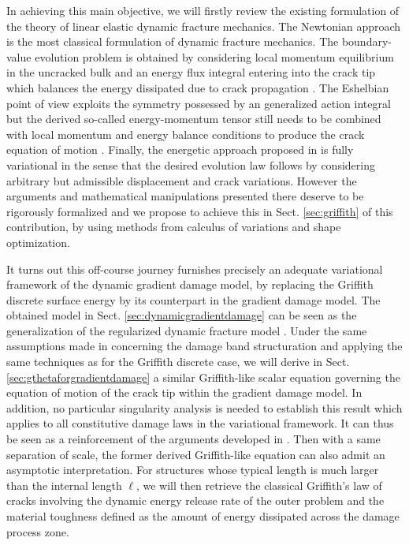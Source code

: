 In achieving this main objective, we will firstly review the existing formulation of the theory of linear elastic dynamic fracture mechanics. The Newtonian approach \cite{Freund:1990} is the most classical formulation of dynamic fracture mechanics. The boundary-value evolution problem is obtained by considering local momentum equilibrium in the uncracked bulk and an energy flux integral entering into the crack tip which balances the energy dissipated due to crack propagation \cite{NakamuraShihFreund:1985,Cherepanov:1989}. The Eshelbian point of view \cite{Eshelby:1951} exploits the symmetry possessed by an generalized action integral but the derived so-called energy-momentum tensor still needs to be combined with local momentum and energy balance conditions to produce the crack equation of motion \cite{Adda-BediaAriasAmarLund:1999}. Finally, the energetic approach proposed in \cite{Oleaga:2001} is fully variational in the sense that the desired evolution law follows by considering arbitrary but admissible displacement and crack variations. However the arguments and mathematical manipulations presented there deserve to be rigorously formalized and we propose to achieve this in Sect. \ref{sec:griffith} of this contribution, by using methods from calculus of variations and shape optimization.

It turns out this off-course journey furnishes precisely an adequate variational framework of the dynamic gradient damage model, by replacing the Griffith discrete surface energy by its counterpart in the gradient damage model. The obtained model in Sect. \ref{sec:dynamicgradientdamage} can be seen as the generalization of the regularized dynamic fracture model \cite{Bourdin:2011,LarsenOrtnerSuli:2010}. Under the same assumptions made in \cite{SicsicMarigo:2013} concerning the damage band structuration and applying the same techniques as for the Griffith discrete case, we will derive in Sect. \ref{sec:gthetaforgradientdamage} a similar Griffith-like scalar equation governing the equation of motion of the crack tip within the gradient damage model. In addition, no particular singularity analysis is needed to establish this result which applies to all constitutive damage laws in the variational framework. It can thus be seen as a reinforcement of the arguments developed in \cite{SicsicMarigo:2013}. Then with a same separation of scale, the former derived Griffith-like equation can also admit an asymptotic interpretation. For structures whose typical length is much larger than the internal length $\ell$, we will then retrieve the classical Griffith's law of cracks involving the dynamic energy release rate of the outer problem and the material toughness defined as the amount of energy dissipated across the damage process zone.


